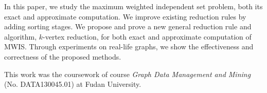 \documentclass[sigconf, nonacm]{acmart}
\begin{document}
In this paper, we study the maximum weighted independent set problem, both its exact and approximate computation. We improve existing reduction rules by adding sorting stages. We propose and prove a new general reduction rule and algorithm, $k$-vertex reduction, for both exact and approximate computation of MWIS. Through experiments on real-life graphs, we show the effectiveness and correctness of the proposed methods.


\begin{acks}
This work was the coursework of course \emph{Graph Data Management and Mining} (No. DATA130045.01) at Fudan University.
\end{acks}



%

\end{document}

